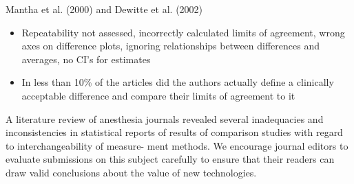\documentclass[MAIN.tex]{subfiles}
\begin{document}
\newpage
Mantha et al. (2000) and Dewitte et al. (2002)
\begin{itemize}
\item Repeatability not assessed, incorrectly calculated limits of agreement, wrong axes on difference plots,
ignoring relationships between differences and averages, no CI’s for estimates
\item In less than 10\% of the articles did the authors actually define a clinically acceptable difference and
compare their limits of agreement to it
\end{itemize}



A literature review of anesthesia journals revealed several inadequacies and inconsistencies in statistical reports of results of 
comparison studies with regard to interchangeability of measure- ment methods. We encourage journal editors to 
evaluate submissions on this subject carefully to ensure that their readers can draw valid conclusions about the value of new technologies.
\end{document}
